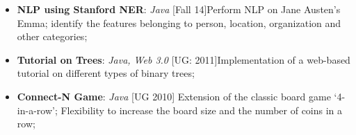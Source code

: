 \documentclass[11pt, letterpaper]{article}
\begin{document}
\begin{multicols}{2}
\begin{itemize}[nolistsep,leftmargin=*]
				\item \textbf{NLP using Stanford NER}: \textit{Java} \hfill[Fall 14]\newline Perform NLP on Jane Austen's Emma; identify the features belonging to person, location, organization and other categories; 
				\item \textbf{Tutorial on Trees}: \textit{Java, Web 3.0} \hfill[UG: 2011]\newline Implementation of a web-based tutorial on different types of binary trees; 
				\item \textbf{Connect-N Game}: \textit{Java} \hfill [UG 2010] Extension of the classic board game `4-in-a-row'; Flexibility to increase the board size and the number of coins in a row;
			\end{itemize}
		
	\end{multicols}
\end{document}
